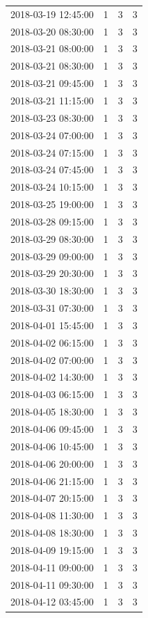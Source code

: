 \begin{tabular}{lrrr}
2018-03-19 12:45:00 & 1 & 3 & 3 \\
2018-03-20 08:30:00 & 1 & 3 & 3 \\
2018-03-21 08:00:00 & 1 & 3 & 3 \\
2018-03-21 08:30:00 & 1 & 3 & 3 \\
2018-03-21 09:45:00 & 1 & 3 & 3 \\
2018-03-21 11:15:00 & 1 & 3 & 3 \\
2018-03-23 08:30:00 & 1 & 3 & 3 \\
2018-03-24 07:00:00 & 1 & 3 & 3 \\
2018-03-24 07:15:00 & 1 & 3 & 3 \\
2018-03-24 07:45:00 & 1 & 3 & 3 \\
2018-03-24 10:15:00 & 1 & 3 & 3 \\
2018-03-25 19:00:00 & 1 & 3 & 3 \\
2018-03-28 09:15:00 & 1 & 3 & 3 \\
2018-03-29 08:30:00 & 1 & 3 & 3 \\
2018-03-29 09:00:00 & 1 & 3 & 3 \\
2018-03-29 20:30:00 & 1 & 3 & 3 \\
2018-03-30 18:30:00 & 1 & 3 & 3 \\
2018-03-31 07:30:00 & 1 & 3 & 3 \\
2018-04-01 15:45:00 & 1 & 3 & 3 \\
2018-04-02 06:15:00 & 1 & 3 & 3 \\
2018-04-02 07:00:00 & 1 & 3 & 3 \\
2018-04-02 14:30:00 & 1 & 3 & 3 \\
2018-04-03 06:15:00 & 1 & 3 & 3 \\
2018-04-05 18:30:00 & 1 & 3 & 3 \\
2018-04-06 09:45:00 & 1 & 3 & 3 \\
2018-04-06 10:45:00 & 1 & 3 & 3 \\
2018-04-06 20:00:00 & 1 & 3 & 3 \\
2018-04-06 21:15:00 & 1 & 3 & 3 \\
2018-04-07 20:15:00 & 1 & 3 & 3 \\
2018-04-08 11:30:00 & 1 & 3 & 3 \\
2018-04-08 18:30:00 & 1 & 3 & 3 \\
2018-04-09 19:15:00 & 1 & 3 & 3 \\
2018-04-11 09:00:00 & 1 & 3 & 3 \\
2018-04-11 09:30:00 & 1 & 3 & 3 \\
2018-04-12 03:45:00 & 1 & 3 & 3 \\

\end{tabular}
